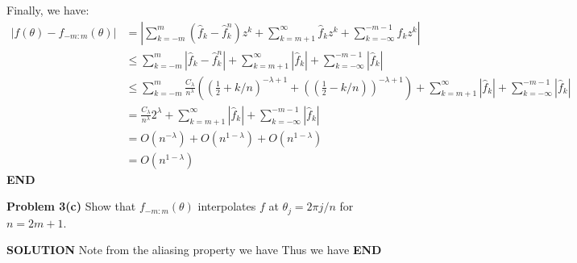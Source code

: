 \documentclass[12pt,a4paper]{article}
\begin{document}
Finally, we have:
\begin{align*}
|f(\ensuremath{\theta}) - f_{-m:m}(\ensuremath{\theta})|
&= |\ensuremath{\sum}_{k=-m}^m {(\hat f_k - \hat f_k^n)z^k} + \ensuremath{\sum}_{k=m+1}^\ensuremath{\infty} {\hat f_k z^k}  + \ensuremath{\sum}_{k=-\ensuremath{\infty}}^{-m-1} {\hat f_k z^k} | \\
&\le \ensuremath{\sum}_{k=-m}^m | \hat f_k - \hat f_k^n | + \ensuremath{\sum}_{k=m+1}^\ensuremath{\infty} |\hat f_k| +  \ensuremath{\sum}_{k=-\ensuremath{\infty}}^{-m-1} |\hat f_k| \\
&\le \ensuremath{\sum}_{k=-m}^m {\frac{C_{\ensuremath{\lambda}}}{ n^{\ensuremath{\lambda}}} \left( \left( \frac{1}{2} + k/n \right)^{ - \ensuremath{\lambda} + 1} + \left( \left( \frac{1}{2} - k/n \right) \right)^{- \ensuremath{\lambda} +1} \right)} + \ensuremath{\sum}_{k=m+1}^\ensuremath{\infty} |\hat f_k| +  \ensuremath{\sum}_{k=-\ensuremath{\infty}}^{-m-1} |\hat f_k| \\
&= \frac{C_{\ensuremath{\lambda}}}{n^{\ensuremath{\lambda}}} 2^{\ensuremath{\lambda}} + \ensuremath{\sum}_{k=m+1}^\ensuremath{\infty} |\hat f_k| +  \ensuremath{\sum}_{k=-\ensuremath{\infty}}^{-m-1} |\hat f_k|  \\
&= O(n^{-\ensuremath{\lambda}}) + O(n^{1-\ensuremath{\lambda}} ) + O(n^{1-\ensuremath{\lambda}} ) \\
&= O(n^{1-\ensuremath{\lambda}})
\end{align*}
\textbf{END}

\textbf{Problem 3(c)} Show that $f_{-m:m}(\ensuremath{\theta})$ interpolates $f$ at $\ensuremath{\theta}_j = 2\ensuremath{\pi}j/n$ for $n = 2m+1$.

\textbf{SOLUTION} Note from the aliasing property we have
Thus we have
\textbf{END}
\end{document}
